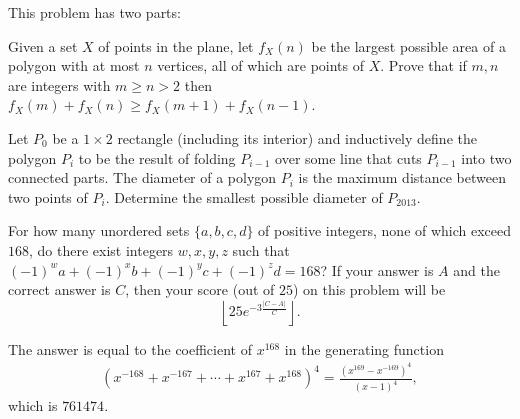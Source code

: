 \begin{question}[name={2013 HMIC, \href{https://artofproblemsolving.com/community/c129h530472p3027316}{Problem 5}}]
	This problem has two parts:
	\begin{tasks}
		\task Given a set $X$ of points in the plane, let $f_{X}(n)$ be the largest possible area of a polygon with at most $n$ vertices, all of which are points of $X$. Prove that if $m, n$ are integers with $m \geq n > 2$ then $f_{X}(m) + f_{X}(n) \geq f_{X}(m + 1) + f_{X}(n - 1)$.
		
		\task Let $P_0$ be a $1 \times 2$ rectangle (including its interior) and inductively define the polygon $P_i$ to be the result of folding $P_{i-1}$ over some line that cuts $P_{i-1}$ into two connected parts. The diameter of a polygon $P_i$ is the maximum distance between two points of $P_i$. Determine the smallest possible diameter of $P_{2013}$.
	\end{tasks}
\end{question}




%	







\begin{question}[name={2013 HMMT, Guts, \href{https://artofproblemsolving.com/community/c129h526574p2986254}{Problem 34}}]
	For how many unordered sets $\{a,b,c,d\}$ of positive integers, none of which exceed $168$, do there exist integers $w,x,y,z$ such that $(-1)^wa+(-1)^xb+(-1)^yc+(-1)^zd=168$? If your answer is $A$ and the correct answer is $C$, then your score (out of $25$) on this problem will be $$\left\lfloor25e^{-3\frac{|C-A|}C}\right\rfloor.$$
\end{question}




\begin{solution}%
	The answer is equal to the coefficient of $x^{168}$ in the generating function
	\begin{align*}
		(x^{-168}+x^{-167}+\cdots+x^{167}+x^{168})^4 = \frac{(x^{169}-x^{-169})^4}{(x-1)^4},
	\end{align*}
	which is $\boxed{761474}$.
\end{solution}










